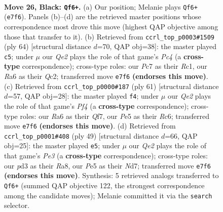 \documentclass[11pt]{article}
\begin{document}
\clearpage

\begin{figure}[p]\centering
\begin{subfigure}{0.46\textwidth}\centering
\resizebox{\linewidth}{!}{%
\newchessgame
\chessboard[
  setfen={r5k1/2p1qp2/r6p/2p1p1p1/2P1P1P1/3P3Q/5K2/1NB2R2 b - - 9 26},
  showmover=false,
  pgfstyle=straightmove, color=movearrow, markmove={e7-f6}
]}
\caption{}
\end{subfigure}\hfill
\begin{subfigure}{0.46\textwidth}\centering
\resizebox{\linewidth}{!}{%
\newchessgame
\chessboard[
  setfen={4r1k1/p7/1p5p/1P2qp2/1PP3pP/3P4/2Q4P/2R3K1 w - - 0 33},
  showmover=false,
  pgfstyle=straightmove, color=movearrow, markmove={c4-c5}
]}
\caption{}
\end{subfigure}
\\[4pt]
\begin{subfigure}{0.46\textwidth}\centering
\resizebox{\linewidth}{!}{%
\newchessgame
\chessboard[
  setfen={2r3k1/1p3qp1/2r5/5p1p/4p2P/P3P1P1/5P2/RR1Q2K1 b - - 0 31},
  showmover=false,
  pgfstyle=straightmove, color=movearrow, markmove={f5-f4}
]}
\caption{}
\end{subfigure}\hfill
\begin{subfigure}{0.46\textwidth}\centering
\resizebox{\linewidth}{!}{%
\newchessgame
\chessboard[
  setfen={r5k1/3n3p/p3p1pB/1p1q4/3p4/3P3P/PPP2Q2/5RK1 b - - 3 25},
  showmover=false,
  pgfstyle=straightmove, color=movearrow, markmove={e6-e5}
]}
\caption{}
\end{subfigure}
\caption{\textbf{Move 26, Black: \texttt{Qf6+}.} (a) Our position; Melanie plays \texttt{Qf6+} (\texttt{e7f6}). Panels (b)--(d) are the retrieved master positions whose correspondence most drove this move (highest QAP objective among those that transfer to it). (b) Retrieved from \texttt{ccrl\_top\_p0003\#1509} (ply 64) [structural distance $d$=70, QAP obj=38]: the master played \texttt{c5}; under $\mu$ our \emph{Qe2} plays the role of that game's \emph{Pc4} (a \textbf{cross-type} correspondence); cross-type roles: our \emph{P}c7 as their \emph{R}c1, our \emph{R}a6 as their \emph{Q}c2; transferred move \texttt{e7f6} \textbf{(endorses this move)}. (c) Retrieved from \texttt{ccrl\_top\_p0000\#187} (ply 61) [structural distance $d$=57, QAP obj=28]: the master played \texttt{f4}; under $\mu$ our \emph{Qe2} plays the role of that game's \emph{Pf4} (a \textbf{cross-type} correspondence); cross-type roles: our \emph{R}a6 as their \emph{Q}f7, our \emph{P}e5 as their \emph{R}c6; transferred move \texttt{e7f6} \textbf{(endorses this move)}. (d) Retrieved from \texttt{ccrl\_top\_p0001\#408} (ply 49) [structural distance $d$=66, QAP obj=25]: the master played \texttt{e5}; under $\mu$ our \emph{Qe2} plays the role of that game's \emph{Pe3} (a \textbf{cross-type} correspondence); cross-type roles: our \emph{p}d3 as their \emph{R}a8, our \emph{P}e5 as their \emph{N}d7; transferred move \texttt{e7f6} \textbf{(endorses this move)}. Synthesis: 5 retrieved analogs transferred to \texttt{Qf6+} (summed QAP objective 122, the strongest correspondence among the candidate moves); Melanie committed it via the \texttt{search} selector.}
\label{fig:thought-m51}
\end{figure}
\end{document}
